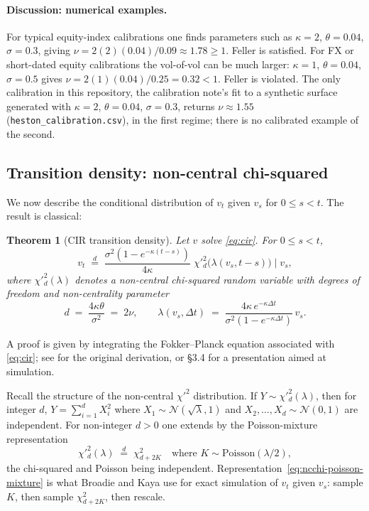 \documentclass[11pt]{article}
\theoremstyle{plain}
\newtheorem{theorem}{Theorem}[section]
\theoremstyle{definition}
\theoremstyle{remark}
\begin{document}
\paragraph{Discussion: numerical examples.}
For typical equity-index calibrations one finds parameters such as \(\kappa = 2\), \(\theta = 0.04\), \(\sigma = 0.3\), giving \(\nu = 2(2)(0.04)/0.09 \approx 1.78 \geq 1\). Feller is satisfied. For FX or short-dated equity calibrations the vol-of-vol can be much larger: \(\kappa = 1\), \(\theta = 0.04\), \(\sigma = 0.5\) gives \(\nu = 2(1)(0.04)/0.25 = 0.32 < 1\). Feller is violated. The only calibration in this repository, the calibration note's fit to a synthetic surface generated with \(\kappa = 2\), \(\theta = 0.04\), \(\sigma = 0.3\), returns \(\nu \approx 1.55\) (\texttt{heston\_calibration.csv}), in the first regime; there is no calibrated example of the second.

\subsection{Transition density: non-central chi-squared}

We now describe the conditional distribution of \(v_t\) given \(v_s\) for \(0 \leq s < t\). The result is classical:

\begin{theorem}[CIR transition density]\label{thm:cir-density}
    Let \(v\) solve \eqref{eq:cir}. For \(0 \leq s < t\),
    \[
        v_t \;\overset{d}{=}\; \frac{\sigma^2(1 - e^{-\kappa(t - s)})}{4\kappa}\;\chi'^2_d\!\bigl(\lambda(v_s, t - s)\bigr) \;\Big|\; v_s,
    \]
    where \(\chi'^2_d(\lambda)\) denotes a non-central chi-squared random variable with degrees of freedom and non-centrality parameter
    \[
        d \;=\; \frac{4\kappa\theta}{\sigma^2} \;=\; 2\nu, \qquad
        \lambda(v_s, \Delta t) \;=\; \frac{4\kappa\,e^{-\kappa\Delta t}}{\sigma^2(1 - e^{-\kappa\Delta t})}\,v_s.
    \]
\end{theorem}

A proof is given by integrating the Fokker--Planck equation associated with \eqref{eq:cir}; see \cite{CIR1985} for the original derivation, or \cite{Glasserman2004} \S3.4 for a presentation aimed at simulation.

Recall the structure of the non-central \(\chi'^2\) distribution. If \(Y \sim \chi'^2_d(\lambda)\), then for integer \(d\), \(Y = \sum_{i=1}^d X_i^2\) where \(X_1 \sim \mathcal{N}(\sqrt{\lambda}, 1)\) and \(X_2, \dots, X_d \sim \mathcal{N}(0, 1)\) are independent. For non-integer \(d > 0\) one extends by the Poisson-mixture representation
\begin{equation}
    \chi'^2_d(\lambda) \;\overset{d}{=}\; \chi^2_{d + 2K} \quad \text{where } K \sim \mathrm{Poisson}(\lambda/2),                       \label{eq:ncchi-poisson-mixture}
\end{equation}
the chi-squared and Poisson being independent. Representation~\eqref{eq:ncchi-poisson-mixture} is what Broadie and Kaya \cite{BroadieKaya2006} use for exact simulation of \(v_t\) given \(v_s\): sample \(K\), then sample \(\chi^2_{d + 2K}\), then rescale.
\end{document}
